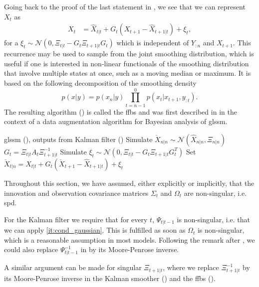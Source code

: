 Going back to the proof of the last statement in , we see that we can represent $X_{t}$ as
\begin{align}
    \label{eq:kalman-smoother-backwards-recursion}
    X_{t} &= \hat X_{t|t} + G_{t}(X_{t + 1} - \hat X_{t + 1 | t}) + \xi_{t},
\end{align}
for a $\xi_{t} \sim \mathcal N \left( 0, \Xi_{t | t} - G_{t} \Xi_{t + 1|t}G_{t} \right)$ which is independent of $Y_{:n}$ and $X_{t + 1}$.
This recurrence may be used to sample from the joint smoothing distribution, which is useful if one is interested in non-linear functionals of the smoothing distribution that involve multiple states at once, such as a moving median or maximum. It is based on the following decomposition of the smoothing density
$$
p(x|y) = p(x_{n}|y) \prod_{t = n - 1}^0 p(x_{t}|x_{t+1}, y_{:t}).
$$
The resulting algorithm () is called the \gls{ffbs}  and was first described in \citep{Fruhwirth-Schnatter1994Data} in the context of a data augmentation algorithm for Bayesian analysis of \gls{glssm}. 

\begin{algorithm}
    \begin{algorithmic}[1]
        \Require \gls{glssm} (), outputs from Kalman filter ()
        \State Simulate $\check X_{n|n} \sim \mathcal N(\hat X_{n|n}, \Xi_{n|n})$
            \State $G_{t} = \Xi_{t|t}A_{t}\Xi^{-1}_{t + 1 | t}$
            \State Simulate $\xi_{t} \sim \mathcal N(0, \Xi_{t|t} - G_{t}\Xi_{t+1|t}G^{T}_t)$
            \State Set $\check X_{t|n} = \hat X_{t|t} + G_{t} \left( \check X_{t + 1} - \hat X_{t + 1| t} \right) + \xi_{t}$
        \EndFor
    \end{algorithmic}
    \caption{Forwards filter, backwards sampling \citep[Proposition 1]{Fruhwirth-Schnatter1994Data}} \label{alg:ffbs}
\end{algorithm}

\begin{remark}
    \label{rem:regular_covs}
    Throughout this section, we have assumed, either explicitly or implicitly, that the innovation and observation covariance matrices $\Sigma_{t}$ and $\Omega_{t}$ are non-singular, i.e. \gls{spd}.

    For the Kalman filter we require that for every $t$, $\Psi_{t|t-1}$ is non-singular, i.e. that we can apply  \ref{it:cond_gaussian}. This is fulfilled as soon as $\Omega_{t}$ is non-singular, which is a reasonable assumption in most models. Following the remark after , we could also replace $\Psi_{t|t-1}^{-1}$ in  by its Moore-Penrose inverse. 

    A similar argument can be made for singular $\Xi_{t+1|t}$, where we replace $\Xi_{t+1|t}^{-1}$ by its Moore-Penrose inverse in the Kalman smoother () and the \gls{ffbs} (). 
\end{remark}

